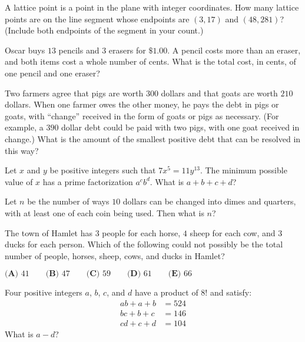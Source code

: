 \documentclass[mast]{lucky}
\begin{document}
\begin{prob}[AHSME 1989/16]{2}
A lattice point is a point in the plane with integer coordinates. How many lattice points are on the line segment whose endpoints are $(3,17)$ and $(48,281)$? (Include both endpoints of the segment in your count.)
\end{prob}

\begin{prob}[AMC 12A 2006/9]{2}
Oscar buys $13$ pencils and $3$ erasers for $\$1.00$. A pencil costs more than an eraser, and both items cost a whole number of cents. What is the total cost, in cents, of one pencil and one eraser?
\end{prob}

\begin{prob}[AMC 12A 2006/14]{3}
Two farmers agree that pigs are worth $300$ dollars and that goats are worth $210$ dollars. When one farmer owes the other money, he pays the debt in pigs or goats, with ``change'' received in the form of goats or pigs as necessary. (For example, a $390$ dollar debt could be paid with two pigs, with one goat received in change.) What is the amount of the smallest positive debt that can be resolved in this way?
\end{prob}

\begin{prob}[AMC 12B 2003/18]{3}
Let $x$ and $y$ be positive integers such that $7x^5=11y^{13}$. The minimum possible value of $x$ has a prime factorization $a^c b^d$. What is $a+b+c+d$?
\end{prob}

\begin{prob}[AHSME 1968/19]{3}
Let $n$ be the number of ways $10$ dollars can be changed into dimes and quarters, with at least one of each coin being used. Then what is $n$?
\end{prob}

\begin{prob}[AMC 10B 2015/15]{4}
The town of Hamlet has $3$ people for each horse, $4$ sheep for each cow, and $3$ ducks for each person. Which of the following could not possibly be the total number of people, horses, sheep, cows, and ducks in Hamlet?
\begin{center}
    $\textbf{(A) }41\qquad\textbf{(B) }47\qquad\textbf{(C) }59\qquad\textbf{(D) }61\qquad\textbf{(E) }66$
\end{center}
\end{prob}

\begin{prob}[AMC 12 2001/21]{6}
Four positive integers $a$, $b$, $c$, and $d$ have a product of $8!$ and satisfy:
\begin{align*} ab + a + b & = 524 \\  bc + b + c & = 146 \\  cd + c + d & = 104 \end{align*}
What is $a-d$?
\end{prob}
\end{document}
